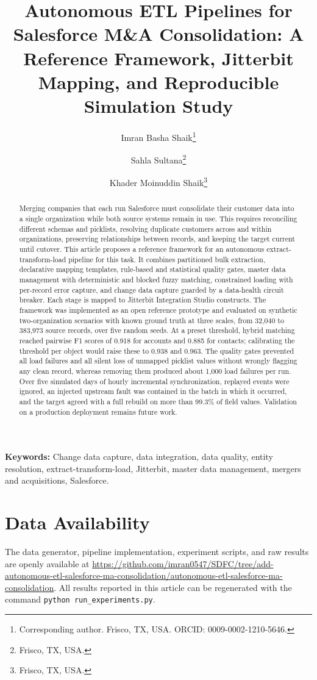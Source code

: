 \documentclass[11pt]{article}
\title{Autonomous ETL Pipelines for Salesforce M\&A Consolidation: A Reference Framework, Jitterbit Mapping, and Reproducible Simulation Study}
\author{Imran Basha Shaik\thanks{Corresponding author. Frisco, TX, USA. ORCID: 0009-0002-1210-5646.} \and Sahla Sultana\thanks{Frisco, TX, USA.} \and Khader Moinuddin Shaik\thanks{Frisco, TX, USA.}}
\date{}
\begin{document}
\maketitle

\begin{abstract}
Merging companies that each run Salesforce must consolidate their customer data into a single organization while both source systems remain in use. This requires reconciling different schemas and picklists, resolving duplicate customers across and within organizations, preserving relationships between records, and keeping the target current until cutover. This article proposes a reference framework for an autonomous extract-transform-load pipeline for this task. It combines partitioned bulk extraction, declarative mapping templates, rule-based and statistical quality gates, master data management with deterministic and blocked fuzzy matching, constrained loading with per-record error capture, and change data capture guarded by a data-health circuit breaker. Each stage is mapped to Jitterbit Integration Studio constructs. The framework was implemented as an open reference prototype and evaluated on synthetic two-organization scenarios with known ground truth at three scales, from 32,040 to 383,973 source records, over five random seeds. At a preset threshold, hybrid matching reached pairwise F1 scores of 0.918 for accounts and 0.885 for contacts; calibrating the threshold per object would raise these to 0.938 and 0.963. The quality gates prevented all load failures and all silent loss of unmapped picklist values without wrongly flagging any clean record, whereas removing them produced about 1,000 load failures per run. Over five simulated days of hourly incremental synchronization, replayed events were ignored, an injected upstream fault was contained in the batch in which it occurred, and the target agreed with a full rebuild on more than 99.3\% of field values. Validation on a production deployment remains future work.
\end{abstract}

\noindent\textbf{Keywords:} Change data capture, data integration, data quality, entity resolution, extract-transform-load, Jitterbit, master data management, mergers and acquisitions, Salesforce.



\section*{Data Availability}
The data generator, pipeline implementation, experiment scripts, and raw results are openly available at \url{https://github.com/imran0547/SDFC/tree/add-autonomous-etl-salesforce-ma-consolidation/autonomous-etl-salesforce-ma-consolidation}. All results reported in this article can be regenerated with the command \texttt{python run\_experiments.py}.
\end{document}

